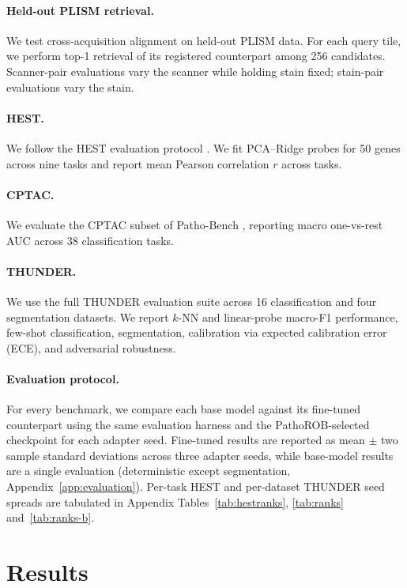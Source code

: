 \documentclass{article}
\begin{document}
\paragraph{Held-out PLISM retrieval.}
We test cross-acquisition alignment on held-out PLISM data. For each query tile, we perform top-1 retrieval of its registered counterpart among 256 candidates. Scanner-pair evaluations vary the scanner while holding stain fixed; stain-pair evaluations vary the stain.

\paragraph{HEST.}
We follow the HEST evaluation protocol \citep{hest}. We fit PCA--Ridge probes for 50 genes across nine tasks and report mean Pearson correlation $r$ across tasks.

\paragraph{CPTAC.}
We evaluate the CPTAC subset of Patho-Bench \citep{pathobench}, reporting macro one-vs-rest AUC across 38 classification tasks.

\paragraph{THUNDER.}
We use the full THUNDER evaluation suite \citep{thunder} across 16 classification and four segmentation datasets. We report $k$-NN and linear-probe macro-F1 performance, few-shot classification, segmentation, calibration via expected calibration error (ECE), and adversarial robustness.

\paragraph{Evaluation protocol.}
For every benchmark, we compare each base model against its fine-tuned counterpart using the same evaluation harness and the PathoROB-selected checkpoint for each adapter seed. Fine-tuned results are reported as mean $\pm$ two sample standard deviations across three adapter seeds, while base-model results are a single evaluation (deterministic except segmentation, Appendix~\ref{app:evaluation}). Per-task HEST and per-dataset THUNDER seed spreads are tabulated in Appendix Tables~\ref{tab:hestranks}, \ref{tab:ranks} and~\ref{tab:ranks-b}.


\section{Results}
\label{sec:results}
\end{document}

